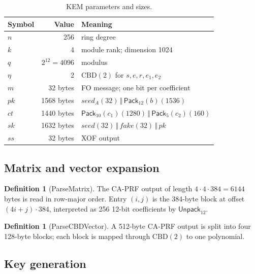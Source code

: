 \documentclass[11pt,a4paper]{article}
\theoremstyle{plain}
\theoremstyle{definition}
\newtheorem{definition}[theorem]{Definition}
\theoremstyle{remark}
\newcommand{\concat}{\,\Vert\,}
\newcommand{\Pack}{\mathsf{Pack}}
\newcommand{\Unpack}{\mathsf{Unpack}}
\newcommand{\CBD}{\mathrm{CBD}}
\begin{document}
\begin{table}[t]
\centering
\small
\begin{tabular}{@{}lrl@{}}
\toprule
Symbol & Value & Meaning \\
\midrule
$n$ & 256 & ring degree \\
$k$ & 4 & module rank; dimension 1024 \\
$q$ & $2^{12}=4096$ & modulus \\
$\eta$ & 2 & $\CBD(2)$ for $s,e,r,e_1,e_2$ \\
$m$ & 32 bytes & FO message; one bit per coefficient \\
$pk$ & 1568 bytes & $\mathit{seed}_A(32)\concat\Pack_{12}(b)(1536)$ \\
$ct$ & 1440 bytes & $\Pack_{10}(c_1)(1280)\concat\Pack_5(c_2)(160)$ \\
$sk$ & 1632 bytes & $\mathit{seed}(32)\concat\mathit{fake}(32)\concat pk$ \\
$ss$ & 32 bytes & XOF output \\
\bottomrule
\end{tabular}
\caption{KEM parameters and sizes.}
\label{tab:kemparams}
\end{table}

\subsection{Matrix and vector expansion}

\begin{definition}[ParseMatrix]
The CA-PRF output of length $4\cdot4\cdot384=6144$ bytes is read in
row-major order.  Entry $(i,j)$ is the 384-byte block at offset
$(4i+j)\cdot384$, interpreted as 256 12-bit coefficients by
$\Unpack_{12}$.
\end{definition}

\begin{definition}[ParseCBDVector]
A 512-byte CA-PRF output is split into four 128-byte blocks; each block
is mapped through $\CBD(2)$ to one polynomial.
\end{definition}

\subsection{Key generation}
\end{document}
